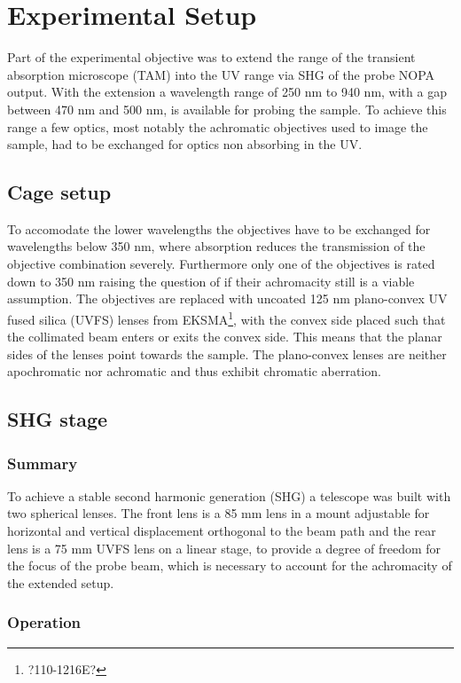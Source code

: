 \documentclass[10pt,a4paper]{article}
\begin{document}
\section{Experimental Setup}
Part of the experimental objective was to extend the range of the transient absorption microscope (TAM) into the UV range via SHG of the probe NOPA output. With the extension a wavelength range of 250 nm to 940 nm, with a gap between 470 nm and 500 nm, is available for probing the sample.\newline
To achieve this range a few optics, most notably the achromatic objectives used to image the sample, had to be exchanged for optics non absorbing in the UV.
\subsection{Cage setup}
To accomodate the lower wavelengths the objectives have to be exchanged for wavelengths below 350 nm, where absorption reduces the transmission of the objective combination severely. Furthermore only one of the objectives is rated down to 350 nm raising the question of if their achromacity still is a viable assumption.\newline
The objectives are replaced with  uncoated 125 nm plano-convex UV fused silica (UVFS) lenses from EKSMA\footnote{?110-1216E?}, with the convex side placed such that the collimated beam enters or exits the convex side. This means that the planar sides of the lenses point towards the sample.
\newline
The plano-convex lenses are neither apochromatic nor achromatic and thus exhibit chromatic aberration.\newline

\subsection{SHG stage}
\subsubsection{Summary}
To achieve a stable second harmonic generation (SHG) a telescope was built with two spherical lenses. The front lens is a 85 mm lens in a mount adjustable for horizontal and vertical displacement orthogonal to the beam path and the rear lens is a 75 mm UVFS lens on a linear stage, to provide a degree of freedom for the focus of the probe beam, which is necessary to account for the achromacity of the extended setup.
\subsubsection{Operation}
\end{document}

